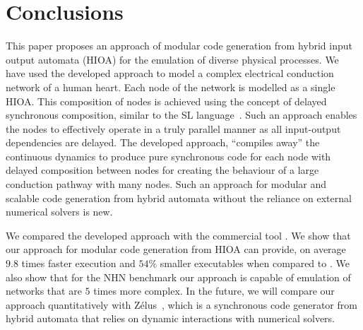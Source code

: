 \section{Conclusions}

This paper proposes an approach of modular code generation 
from hybrid input output automata (HIOA)
for the emulation of diverse physical processes. 
We have used the developed approach to model 
 a complex electrical conduction network of a human heart.
Each node of the network is modelled as a single HIOA.
This composition of nodes is achieved using the concept of 
delayed synchronous composition, similar to the SL 
language~\cite{SlLanguage}. 
Such an approach enables the nodes to effectively operate 
in a truly parallel manner as all
input-output dependencies are delayed. 
The developed approach,  ``compiles away'' the continuous dynamics to
produce pure synchronous code for each node with delayed composition between nodes for creating the behaviour of a large conduction 
pathway with many nodes. Such an approach for modular and scalable code generation from hybrid automata without the reliance on external numerical solvers is new.

We compared the developed approach with the commercial tool \simulink. We show that our approach for modular code generation from \ac{HIOA} can 
provide, on average $9.8$ times faster execution and $54\%$ smaller executables 
when compared to \simulink.
We also show that for the \acf{NHN} benchmark our approach is capable of 
emulation of networks that are $5$ times more complex. 
In the future, we will compare our approach quantitatively with Z\'{e}lus~\cite{bourke13zelus},
 which is a synchronous code generator from hybrid automata that relies on dynamic interactions with numerical solvers.

